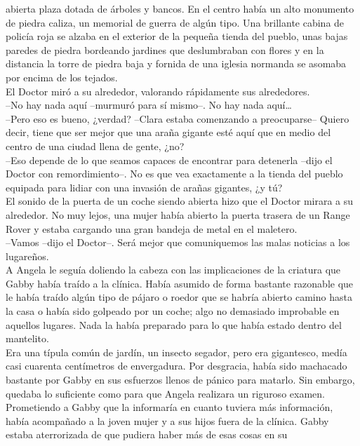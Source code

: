{abierta plaza dotada de árboles y bancos. En el centro había un alto
monumento de piedra caliza, un memorial de guerra de algún tipo. Una
brillante cabina de policía roja se alzaba en el exterior de la pequeña
tienda del pueblo, unas bajas paredes de piedra bordeando jardines que
deslumbraban con flores y en la distancia la torre de piedra baja y
fornida de una iglesia normanda se asomaba por encima de los tejados.\\
El Doctor miró a su alrededor, valorando rápidamente sus alrededores.\\
--No hay nada aquí --murmuró para sí mismo--. No hay nada aquí\ldots{}\\
--Pero eso es bueno, ¿verdad? --Clara estaba comenzando a preocuparse--
Quiero decir, tiene que ser mejor que una araña gigante esté aquí que en
medio del centro de una ciudad llena de gente, ¿no?\\
--Eso depende de lo que seamos capaces de encontrar para detenerla
--dijo el Doctor con remordimiento--. No es que vea exactamente a la
tienda del pueblo equipada para lidiar con una invasión de arañas
gigantes, ¿y tú?\\
El sonido de la puerta de un coche siendo abierta hizo que el Doctor
mirara a su alrededor. No muy lejos, una mujer había abierto la puerta
trasera de un Range Rover y estaba cargando una gran bandeja de metal en
el maletero.\\
--Vamos --dijo el Doctor--. Será mejor que comuniquemos las malas
noticias a los lugareños.\\[2\baselineskip]A Angela le seguía doliendo
la cabeza con las implicaciones de la criatura que Gabby había traído a
la clínica. Había asumido de forma bastante razonable que le había
traído algún tipo de pájaro o roedor que se habría abierto camino hasta
la casa o había sido golpeado por un coche; algo no demasiado improbable
en aquellos lugares. Nada la había preparado para lo que había estado
dentro del mantelito.\\
Era una típula común de jardín, un insecto segador, pero era gigantesco,
medía casi cuarenta centímetros de envergadura. Por desgracia, había
sido machacado bastante por Gabby en sus esfuerzos llenos de pánico para
matarlo. Sin embargo, quedaba lo suficiente como para que Angela
realizara un riguroso examen.\\
Prometiendo a Gabby que la informaría en cuanto tuviera más información,
había acompañado a la joven mujer y a sus hijos fuera de la clínica.
Gabby estaba aterrorizada de que pudiera haber más de esas cosas en su
}
